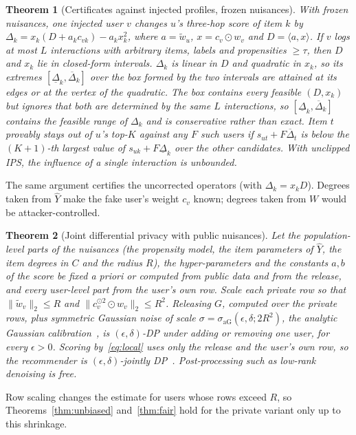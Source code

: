 \documentclass[preprint,review,12pt,authoryear]{elsarticle}
\newtheorem{theorem}{Theorem}
\theoremstyle{definition}
\begin{document}
\begin{theorem}[Certificates against injected profiles, frozen nuisances]\label{thm:robust}
With frozen nuisances, one injected user $v$ changes $u$'s three-hop score of item
$k$ by $\Delta_k=x_k(D+a_kc_{vk})-a_kx_k^2$, where $a=\tilde w_u$, $x=c_v\odot w_v$
and $D=\langle a,x\rangle$. If $v$ logs at most $L$ interactions with arbitrary
items, labels and propensities $\ge\tau$, then $D$ and $x_k$ lie in closed-form
intervals. $\Delta_k$ is linear in $D$ and quadratic in $x_k$, so its extremes
$[\underline\Delta_k,\overline\Delta_k]$ over the box formed by the two intervals
are attained at its edges or at the vertex of the quadratic. The box contains
every feasible $(D,x_k)$ but ignores that both are determined by the same $L$
interactions, so $[\underline\Delta_k,\overline\Delta_k]$ contains the feasible
range of $\Delta_k$ and is conservative rather than exact. Item $t$
provably stays out of $u$'s top-$K$ against any $F$ such users if
$s_{ut}+F\overline\Delta_t$ is below the $(K{+}1)$-th largest value of
$s_{uk}+F\underline\Delta_k$ over the other candidates. With unclipped IPS, the
influence of a single interaction is unbounded.
\end{theorem}
The same argument certifies the uncorrected operators (with
$\Delta_k=x_kD$). Degrees taken from $\hat Y$ make the fake user's weight $c_v$
known; degrees taken from $W$ would be attacker-controlled.

\begin{theorem}[Joint differential privacy with public nuisances]\label{thm:dp}
Let the population-level parts of the nuisances (the propensity model, the
item parameters of $\hat Y$, the item degrees in $C$ and the radius $R$), the
hyper-parameters and the constants $a,b$ of the score be fixed a priori or
computed from public data and from the release, and every user-level part
from the user's own row.
Scale each private row so that $\|\tilde w_v\|_2\le R$ and
$\|c_v^{\odot2}\odot w_v\|_2\le R^2$. Releasing $G$, computed over the private
rows, plus symmetric Gaussian noise of scale
$\sigma=\sigma_{\mathrm{aG}}(\epsilon,\delta;2R^2)$, the analytic Gaussian
calibration~\citep{balle2018analytic}, is $(\epsilon,\delta)$-DP under adding or
removing one user, for every $\epsilon>0$. Scoring by~\eqref{eq:local} uses only
the release and the user's own row, so the recommender is $(\epsilon,\delta)$-jointly
DP~\citep{hsu2014matchings}. Post-processing such as low-rank denoising is free.
\end{theorem}
Row scaling changes the estimate for users whose rows exceed $R$, so
Theorems~\ref{thm:unbiased} and~\ref{thm:fair} hold for the private variant only
up to this shrinkage.
\end{document}
